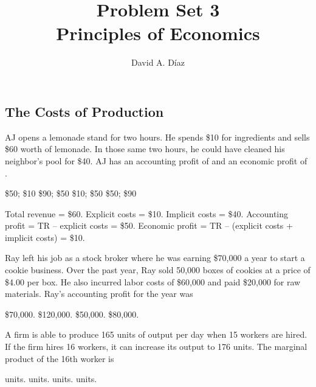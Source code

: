 \documentclass[addpoints,11pt]{exam}
\theoremstyle{definition}
\newcommand{\dd}[1]{}
\newcommand{\blank}[0]{\underline{\hspace{3cm}}}
\begin{document}
	\title{\textbf{Problem Set 3 \dd{Answers and Selected Solutions}} \\ \vspace{2 mm} {\large Principles of Economics}}
	\author{David A. D\'iaz}
	\date{}
	\maketitle

\subsection*{The Costs of Production}

\begin{questions}
	
			\question AJ opens a lemonade stand for two hours. He spends \$10 for ingredients and sells \$60 worth of lemonade. In those same two hours, he could have cleaned his neighbor's pool for \$40. AJ has an accounting profit of \blank and an economic profit of \blank.
			
			\begin{choices}
				\CorrectChoice \$50; \$10
				\choice \$90; \$50
				\choice \$10; \$50
				\choice \$50; \$90
			\end{choices}
			
			\begin{solution}
				Total revenue = \$60. Explicit costs = \$10. Implicit costs = \$40. Accounting profit = TR -- explicit costs = \$50. Economic profit = TR -- (explicit costs + implicit costs) = \$10.
			\end{solution}
			
\question Ray left his job as a stock broker where he was earning \$70,000 a year to start a cookie business. Over the past year, Ray sold 50,000 boxes of cookies at a price of \$4.00 per box. He also incurred labor costs of \$60,000 and paid \$20,000 for raw materials. Ray's accounting profit for the year was

\begin{choices}
	\choice \$70,000.
	\CorrectChoice \$120,000.
	\choice \$50,000.
	\choice \$80,000.
\end{choices}

\question A firm is able to produce 165 units of output per day when 15 workers are hired. If the firm hires 16 workers, it can increase its output to 176 units. The marginal product of the 16th worker is

\begin{choices}
	 units.
	 units.
	 units.
	 units.
\end{choices}
			

\end{questions}
\end{document}
